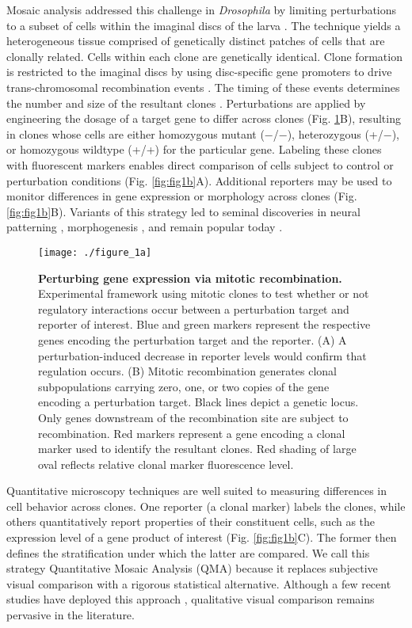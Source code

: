 Mosaic analysis addressed this challenge in \textit{Drosophila} by limiting perturbations to a subset of cells within the imaginal discs of the larva \cite{Xu1993,Xu2012}. The technique yields a heterogeneous tissue comprised of genetically distinct patches of cells that are clonally related. Cells within each clone are genetically identical. Clone formation is restricted to the imaginal discs by using disc-specific gene promoters to drive trans-chromosomal recombination events \cite{Newsome2000,Theodosiou1998}. The timing of these events determines the number and size of the resultant clones \cite{Struhl1993}. Perturbations are applied by engineering the dosage of a target gene to differ across clones (Fig. \ref{fig:fig1a}B), resulting in clones whose cells are either homozygous mutant ($-$/$-$), heterozygous (+/$-$), or homozygous wildtype (+/+) for the particular gene. Labeling these clones with fluorescent markers enables direct comparison of cells subject to control or perturbation conditions (Fig. \ref{fig:fig1b}A). Additional reporters may be used to monitor differences in gene expression or morphology across clones (Fig. \ref{fig:fig1b}B). Variants of this strategy led to seminal discoveries in neural patterning \cite{Halfar2001,Tomlinson2001,Yang2001}, morphogenesis \cite{Huang2005,Thompson2006}, and remain popular today \cite{Atkins2019,Enomoto2018,Germani2018}.

\begin{figure}[!h]
\centering
\texttt{[image: ./figure\_1a]}
\caption[Perturbing gene expression via mitotic recombination.]{\textbf{Perturbing gene expression via mitotic recombination.} Experimental framework using mitotic clones to test whether or not regulatory interactions occur between a perturbation target and reporter of interest. Blue and green markers represent the respective genes encoding the perturbation target and the reporter. (A) A perturbation-induced decrease in reporter levels would confirm that regulation occurs. (B) Mitotic recombination generates clonal subpopulations carrying zero, one, or two copies of the gene encoding a perturbation target. Black lines depict a genetic locus. Only genes downstream of the recombination site are subject to recombination. Red markers represent a gene encoding a clonal marker used to identify the resultant clones. Red shading of large oval reflects relative clonal marker fluorescence level.}
\label{fig:fig1a}
\end{figure}

Quantitative microscopy techniques are well suited to measuring differences in cell behavior across clones. One reporter (a clonal marker) labels the clones, while others quantitatively report properties of their constituent cells, such as the expression level of a gene product of interest (Fig. \ref{fig:fig1b}C). The former then defines the stratification under which the latter are compared. We call this strategy Quantitative Mosaic Analysis (QMA) because it replaces subjective visual comparison with a rigorous statistical alternative. Although a few recent studies have deployed this approach \cite{Dai2017,Bernasek2018,Ghiglione2018,Li2018}, qualitative visual comparison remains pervasive in the literature.


